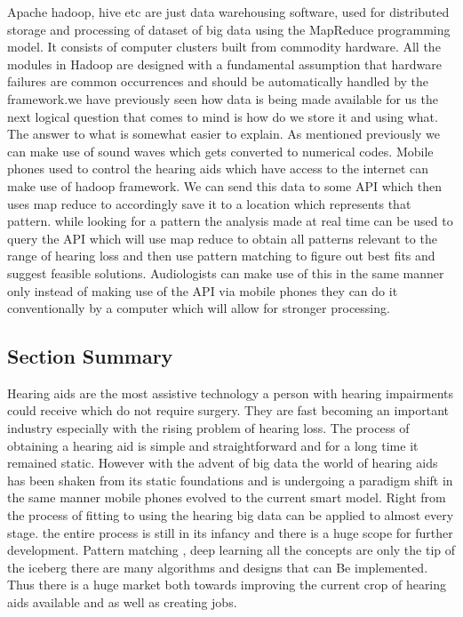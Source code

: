 \documentclass[sigconf]{acmart}
\begin{document}
Apache hadoop, hive etc are just data warehousing software, used for distributed storage and processing of dataset of big data using the MapReduce programming model. It consists of computer clusters built from commodity hardware. All the modules in Hadoop are designed with a fundamental assumption that hardware failures are common occurrences and should be automatically handled by the framework.we have previously seen how data is being made available for us the next logical question that comes to mind is how do we store it and using what. The answer to what is somewhat easier to explain. As mentioned previously we can make use of sound waves which gets converted to numerical codes. Mobile phones used to control the hearing aids which have access to the internet can make use of hadoop framework. We can send this data to some API which then uses map reduce to accordingly save it to a location which represents that pattern. while looking for a pattern the analysis made at real time can be used to query the API which will use map reduce to obtain all patterns relevant to the range of hearing loss and then use pattern matching to figure out best fits and suggest feasible solutions. Audiologists can make use of this in the same manner only instead of making use of the API via mobile phones they can do it conventionally by a computer which will allow for stronger processing.

\subsection{Section Summary}

Hearing aids are the most assistive technology a person with hearing impairments could receive which do not require surgery. They are fast becoming an important industry especially with the rising problem of hearing loss. The process of obtaining a hearing aid is simple and straightforward and for a long time it remained static. However with the advent of big data the world of hearing aids has been shaken from its static foundations and is undergoing a paradigm shift in the same manner mobile phones evolved to the current smart model. Right from the process of fitting to using the hearing big data can be applied to almost every stage. the entire process is still in its infancy and there is a huge scope for further development. Pattern matching , deep learning all the concepts are only the tip of the iceberg there are many algorithms and designs that can Be implemented. Thus there is a huge market both towards improving the current crop of hearing aids available and as well as creating jobs.
\end{document}
